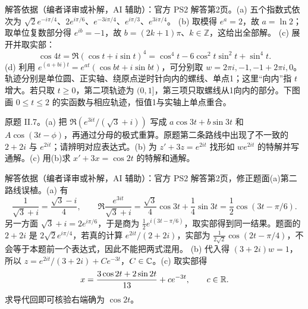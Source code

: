 \begin{solution}
解答依据（编者译审或补解，AI 辅助）：官方 PS2 解答第2页。(a) 五个指数式依次为 $\sqrt2e^{-i\pi/4}$、$2e^{i\pi/6}$、$e^{-3i\pi/4}$、$e^{i\pi/3}$、$e^{3i\pi/4}$。
(b) 取模得 $e^a=2$，故 $a=\ln2$；取单位复数部分得 $e^{ib}=-1$，故 $b=(2k+1)\pi$、$k\in\mathbb Z$，这给出全部解。
(c) 展开并取实部：
\[
 \cos4t=\Re(\cos t+i\sin t)^4
 =\cos^4t-6\cos^2t\sin^2t+\sin^4t.
\]
(d) 利用 $e^{(a+bi)t}=e^{at}(\cos bt+i\sin bt)$，可分别取 $w=2\pi i,-1,-1+2\pi i,0$。轨迹分别是单位圆、正实轴、绕原点逆时针向内的螺线、单点1；这里“向内”指 $t$ 增大。若只取 $t\geq0$，第二项轨迹为 $(0,1]$，第三项只取螺线从1向内的部分。下图画 $0\leq t\leq2$ 的实函数与相应轨迹，恒值1与实轴上单点重合。
\begin{center}\end{center}
\end{solution}
\begin{exercise}\label{cw:ps2-II-7}
原题 II.7。(a) 把 $\Re(e^{3it}/(\sqrt3+i))$ 写成 $a\cos3t+b\sin3t$ 和 $A\cos(3t-\phi)$，再通过分母的极式重算。原题第二条路线中出现了不一致的 $2+2i$ 与 $e^{2it}$；请辨明对应表达式。(b) 为 $z'+3z=e^{2it}$ 找形如 $we^{2it}$ 的特解并写通解。(c) 用(b)求 $x'+3x=\cos2t$ 的特解和通解。
\end{exercise}
\begin{solution}
解答依据（编者译审或补解，AI 辅助）：官方 PS2 解答第2页，修正题面(a)第二路线误植。(a) 有
\[
 \frac1{\sqrt3+i}=\frac{\sqrt3-i}{4},\qquad
 \Re\frac{e^{3it}}{\sqrt3+i}=\frac{\sqrt3}4\cos3t+\frac14\sin3t
 =\frac12\cos(3t-\pi/6).
\]
另一方面 $\sqrt3+i=2e^{i\pi/6}$，于是商为 $\frac12e^{i(3t-\pi/6)}$，取实部得到同一结果。题面的 $2+2i$ 是 $2\sqrt2e^{i\pi/4}$，若真的计算 $e^{2it}/(2+2i)$，实部为 $\frac1{2\sqrt2}\cos(2t-\pi/4)$，不会等于本题前一个表达式，因此不能把两式混用。
(b) 代入得 $(3+2i)w=1$，所以 $z=e^{2it}/(3+2i)+Ce^{-3t}$，$C\in\mathbb C$。(c) 取实部得
\[
 x=\frac{3\cos2t+2\sin2t}{13}+ce^{-3t},\qquad c\in\mathbb R.
\]
求导代回即可核验右端确为 $\cos2t$。
\end{solution}

